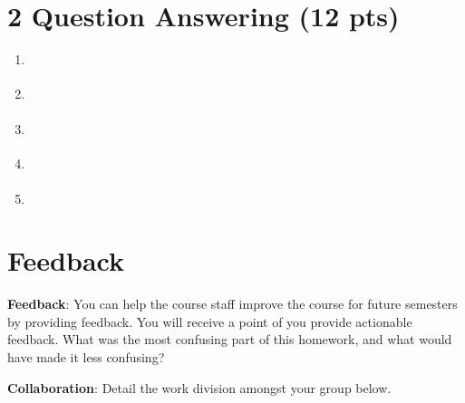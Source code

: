 \documentclass[12pt]{article}
\begin{document}
\section*{2 Question Answering (12 pts)}
\begin{enumerate}
    \item \noindent\begin{solution}[height=5cm]
    \end{solution}

    \item \noindent\begin{solution}[height=5cm]
    \end{solution}

    \item \noindent\begin{solution}[height=5cm]
    \end{solution}

    \item \noindent\begin{solution}[height=5cm]
    \end{solution}

    \item \noindent\begin{solution}[height=10cm]
    \end{solution}
\end{enumerate}




\clearpage
\section*{Feedback}

\textbf{Feedback}: You can help the course staff improve the course for future semesters by providing feedback. You will receive a point of you provide actionable feedback. What was the most confusing part of this homework, and what would have made it less confusing?
\begin{solution}[height=4cm]
\end{solution}

\textbf{Collaboration}: Detail the work division amongst your group below.
\begin{solution}[height=4cm]
\end{solution}
\end{document}
